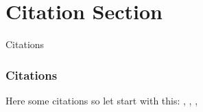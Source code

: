 \section{Citation Section}
\label{sec:citations} %

\begin{frame}{Citations} %
    \frametitle{Citations}
    Here some citations so let start with this:   \textcite{exampleArticle}, \textcite{examplePaper}, \textcite{exampleBook}, \textcite{exampleWebsite}
\end{frame}
